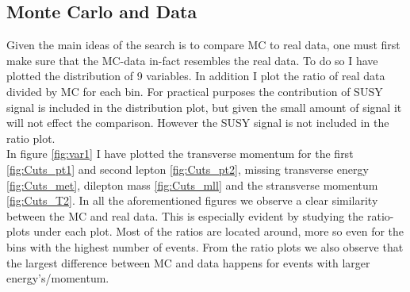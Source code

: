 \documentclass{article}
\begin{document}
\subsection{Monte Carlo and Data}\label{subsec:MCandData}
Given the main ideas of the search is to compare MC to real data, one must first make sure that the MC-data in-fact resembles the real data. To do so I have plotted the distribution of 9 variables. In addition I plot the ratio of real data divided by MC for each bin. For practical purposes the contribution of SUSY signal is included in the distribution plot, but given the small amount of signal it will not effect the comparison. However the SUSY signal is not included in the ratio plot.
\\
In figure \ref{fig:var1} I have plotted the transverse momentum for the first \ref{fig:Cuts_pt1} and second lepton \ref{fig:Cuts_pt2}, missing transverse energy \ref{fig:Cuts_met}, dilepton mass \ref{fig:Cuts_mll} and the stransverse momentum \ref{fig:Cuts_T2}. In all the aforementioned figures we observe a clear similarity between the MC and real data. This is especially evident by studying the ratio-plots under each plot. Most of the ratios are located around, more so even for the bins with the highest number of events. From the ratio plots we also observe that the largest difference between MC and data happens for events with larger energy's/momentum.  
\\
\end{document}
